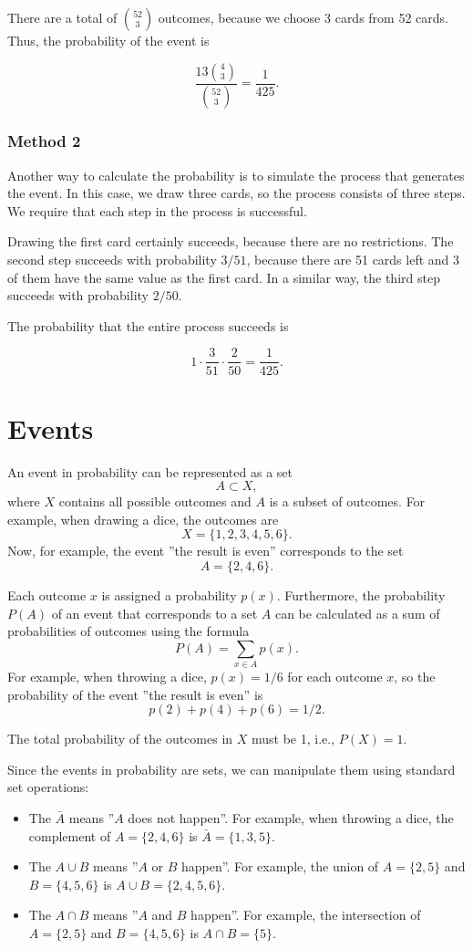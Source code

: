 There are a total of ${52 \choose 3}$ outcomes,
because we choose 3 cards from 52 cards.
Thus, the probability of the event is

\[\frac{13 {4 \choose 3}}{{52 \choose 3}} = \frac{1}{425}.\]

\subsubsection*{Method 2}

Another way to calculate the probability is
to simulate the process that generates the event.
In this case, we draw three cards, so the process
consists of three steps.
We require that each step in the process is successful.

Drawing the first card certainly succeeds,
because there are no restrictions.
The second step succeeds with probability $3/51$,
because there are 51 cards left and 3 of them
have the same value as the first card.
In a similar way, the third step succeeds with probability $2/50$.

The probability that the entire process succeeds is

\[1 \cdot \frac{3}{51} \cdot \frac{2}{50} = \frac{1}{425}.\]

\section{Events}

An event in probability can be represented as a set
\[A \subset X,\]
where $X$ contains all possible outcomes
and $A$ is a subset of outcomes.
For example, when drawing a dice, the outcomes are
\[X = \{1,2,3,4,5,6\}.\]
Now, for example, the event ''the result is even''
corresponds to the set
\[A = \{2,4,6\}.\]

Each outcome $x$ is assigned a probability $p(x)$.
Furthermore, the probability $P(A)$ of an event
that corresponds to a set $A$ can be calculated as a sum
of probabilities of outcomes using the formula
\[P(A) = \sum_{x \in A} p(x).\]
For example, when throwing a dice,
$p(x)=1/6$ for each outcome $x$,
so the probability of the event
''the result is even'' is
\[p(2)+p(4)+p(6)=1/2.\]

The total probability of the outcomes in $X$ must
be 1, i.e., $P(X)=1$.

Since the events in probability are sets,
we can manipulate them using standard set operations:

\begin{itemize}
\item The  $\bar A$ means
''$A$ does not happen''.
For example, when throwing a dice, 
the complement of $A=\{2,4,6\}$ is
$\bar A = \{1,3,5\}$.
\item The  $A \cup B$ means
''$A$ or $B$ happen''.
For example, the union of
$A=\{2,5\}$
and $B=\{4,5,6\}$ is
$A \cup B = \{2,4,5,6\}$.
\item The  $A \cap B$ means
''$A$ and $B$ happen''.
For example, the intersection of
$A=\{2,5\}$ and $B=\{4,5,6\}$ is
$A \cap B = \{5\}$.
\end{itemize}

